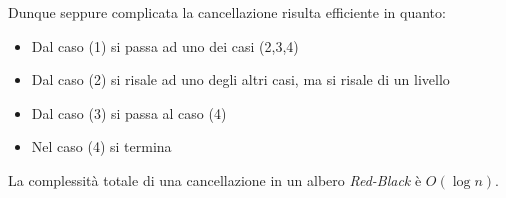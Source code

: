         Dunque seppure complicata la cancellazione risulta efficiente in quanto:
        \begin{itemize}
            \item Dal caso (1) si passa ad uno dei casi (2,3,4)
            \item Dal caso (2) si risale ad uno degli altri casi, ma si risale di un livello
            \item Dal caso (3) si passa al caso (4)
            \item Nel caso (4) si termina
        \end{itemize}
        La complessità totale di una cancellazione in un albero \textit{Red-Black} è $O(\log n)$.